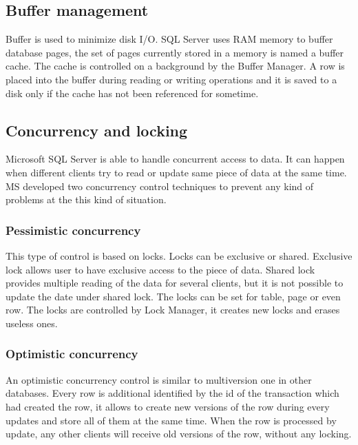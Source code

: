 \documentclass[english]{article}
\begin{document}
\subsection{Buffer management}
Buffer is used to minimize disk I/O. SQL Server uses RAM memory to buffer database pages, the set of pages currently stored in a memory is named a buffer cache. The cache is controlled on a background by the Buffer Manager. A row is placed into the buffer during reading or writing operations and it is saved to a disk only if the cache has not been referenced for sometime. 

\subsection{Concurrency and locking}
Microsoft SQL Server is able to handle concurrent access to data. It can happen when different clients try to read or update same piece of data at the same time. MS developed two concurrency control techniques to prevent any kind of problems at the this kind of situation.
\subsubsection{Pessimistic concurrency}
This type of control is based on locks. Locks can be exclusive or shared. Exclusive lock allows user to have exclusive access to the piece of data. Shared lock provides multiple reading of the data for several clients, but it is not possible to update the date under shared lock. The locks can be set for table, page or even row. The locks are controlled by Lock Manager, it creates new locks and erases useless ones.
\subsubsection{Optimistic concurrency}
An optimistic concurrency control is similar to multiversion one in other databases. Every row is additional identified by the id of the transaction which had created the row, it allows to create new versions of the row during every updates and store all of them at the same time. When the row is processed by update, any other clients will receive old versions of the row, without any locking.
\end{document}
